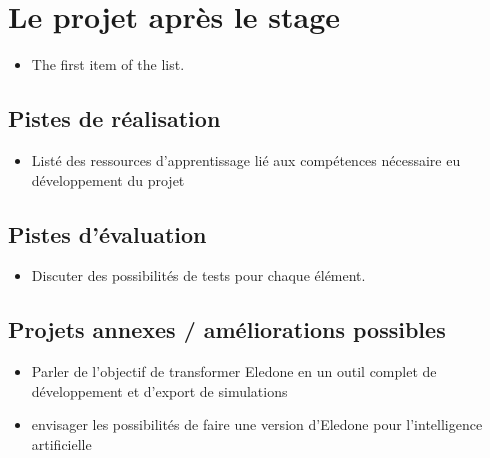 \documentclass{rapport_stage}
\begin{document}
\cleardoublepage


\part{Le projet après le stage}

\begin{itemize}[label=$\bullet$]
  \item The first item of the list.
\end{itemize}

\chapter{Pistes de réalisation}

\begin{itemize}[label=$\bullet$]
  \item Listé des ressources d'apprentissage lié aux compétences nécessaire eu développement du projet
\end{itemize}

\chapter{Pistes d'évaluation}

\begin{itemize}[label=$\bullet$]
  \item Discuter des possibilités de tests pour chaque élément.
\end{itemize}

\chapter{Projets annexes / améliorations possibles}

\begin{itemize}[label=$\bullet$]
  \item Parler de l'objectif de transformer Eledone en un outil complet de développement et d'export de simulations
  \item envisager les possibilités de faire une version d'Eledone pour l'intelligence artificielle
\end{itemize}

\cleardoublepage


\printbibliography[
  heading=bibintoc,
  title=Bibliographie / Webographie
]
\end{document}
